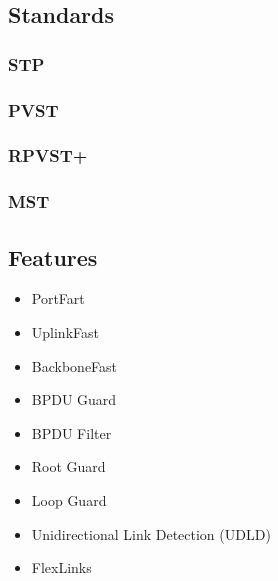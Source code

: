\subsection{Standards}

\subsubsection{STP}

\subsubsection{PVST}

\subsubsection{RPVST+}

\subsubsection{MST}

\subsection{Features}

\begin{itemize}
	\item PortFart
	\item UplinkFast
	\item BackboneFast
	\item BPDU Guard
	\item BPDU Filter
	\item Root Guard
	\item Loop Guard
	\item Unidirectional Link Detection (UDLD)
	\item FlexLinks
\end{itemize}
